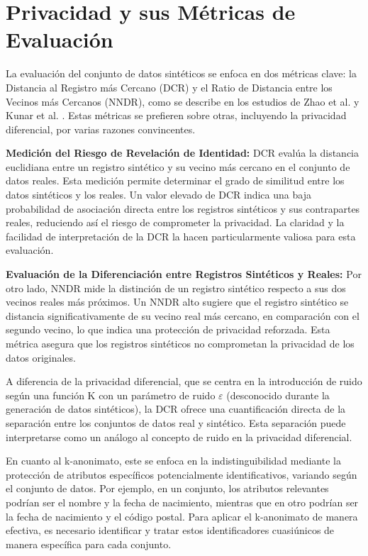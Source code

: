 \section{Privacidad y sus Métricas de Evaluación}
La evaluación del conjunto de datos sintéticos se enfoca en dos métricas clave: la Distancia al Registro más Cercano (DCR) y el Ratio de Distancia entre los Vecinos más Cercanos (NNDR), como se describe en los estudios de Zhao et al. \cite{zhao_ctab-gan_2021} y Kunar et al. \cite{kunar_effective_nodate}. Estas métricas se prefieren sobre otras, incluyendo la privacidad diferencial, por varias razones convincentes.

\textbf{Medición del Riesgo de Revelación de Identidad:} DCR evalúa la distancia euclidiana entre un registro sintético y su vecino más cercano en el conjunto de datos reales. Esta medición permite determinar el grado de similitud entre los datos sintéticos y los reales. Un valor elevado de DCR indica una baja probabilidad de asociación directa entre los registros sintéticos y sus contrapartes reales, reduciendo así el riesgo de comprometer la privacidad. La claridad y la facilidad de interpretación de la DCR la hacen particularmente valiosa para esta evaluación.

\textbf{Evaluación de la Diferenciación entre Registros Sintéticos y Reales:} Por otro lado, NNDR mide la distinción de un registro sintético respecto a sus dos vecinos reales más próximos. Un NNDR alto sugiere que el registro sintético se distancia significativamente de su vecino real más cercano, en comparación con el segundo vecino, lo que indica una protección de privacidad reforzada. Esta métrica asegura que los registros sintéticos no comprometan la privacidad de los datos originales.

A diferencia de la privacidad diferencial, que se centra en la introducción de ruido según una función K con un parámetro de ruido $\varepsilon$ (desconocido durante la generación de datos sintéticos), la DCR ofrece una cuantificación directa de la separación entre los conjuntos de datos real y sintético. Esta separación puede interpretarse como un análogo al concepto de ruido en la privacidad diferencial.

En cuanto al k-anonimato, este se enfoca en la indistinguibilidad mediante la protección de atributos específicos potencialmente identificativos, variando según el conjunto de datos. Por ejemplo, en un conjunto, los atributos relevantes podrían ser el nombre y la fecha de nacimiento, mientras que en otro podrían ser la fecha de nacimiento y el código postal. Para aplicar el k-anonimato de manera efectiva, es necesario identificar y tratar estos identificadores cuasiúnicos de manera específica para cada conjunto.

